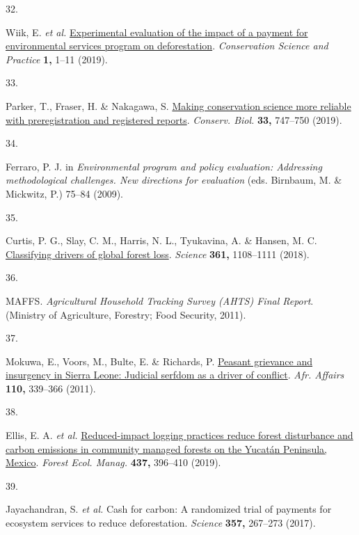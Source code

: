 \documentclass[
]{article}
\newlength{\cslhangindent}
\newlength{\csllabelwidth}
\newlength{\cslentryspacingunit} %
\newenvironment{CSLReferences}[2] %
 {%
  \setlength{\parindent}{0pt}
  \ifodd #1
  \let\oldpar\par
  \def\par{\hangindent=\cslhangindent\oldpar}
  \fi
  \setlength{\parskip}{#2\cslentryspacingunit}
 }%
 {}
\newcommand{\CSLLeftMargin}[1]{\parbox[t]{\csllabelwidth}{#1}}
\newcommand{\CSLRightInline}[1]{\parbox[t]{\linewidth - \csllabelwidth}{#1}\break}
\begin{document}
\begin{CSLReferences}{0}{0}
\leavevmode{}%
\CSLLeftMargin{32. }%
\CSLRightInline{Wiik, E. \emph{et al.}
\href{https://doi.org/10.1111/csp2.8}{{Experimental evaluation of the
impact of a payment for environmental services program on
deforestation}}. \emph{Conservation Science and Practice} \textbf{1,}
1--11 (2019).}

\leavevmode{}%
\CSLLeftMargin{33. }%
\CSLRightInline{Parker, T., Fraser, H. \& Nakagawa, S.
\href{https://doi.org/10.1111/cobi.13342}{{Making conservation science
more reliable with preregistration and registered reports}}.
\emph{Conserv. Biol.} \textbf{33,} 747--750 (2019).}

\leavevmode{}%
\CSLLeftMargin{34. }%
\CSLRightInline{Ferraro, P. J. in \emph{Environmental program and policy
evaluation: Addressing methodological challenges. New directions for
evaluation} (eds. Birnbaum, M. \& Mickwitz, P.) 75--84 (2009).}

\leavevmode{}%
\CSLLeftMargin{35. }%
\CSLRightInline{Curtis, P. G., Slay, C. M., Harris, N. L., Tyukavina, A.
\& Hansen, M. C.
\href{https://doi.org/10.1126/science.aau3445}{{Classifying drivers of
global forest loss}}. \emph{Science} \textbf{361,} 1108--1111 (2018).}

\leavevmode{}%
\CSLLeftMargin{36. }%
\CSLRightInline{MAFFS. \emph{{Agricultural Household Tracking Survey
(AHTS) Final Report}}. (Ministry of Agriculture, Forestry; Food
Security, 2011).}

\leavevmode{}%
\CSLLeftMargin{37. }%
\CSLRightInline{Mokuwa, E., Voors, M., Bulte, E. \& Richards, P.
\href{https://doi.org/10.1093/afraf/adr019}{{Peasant grievance and
insurgency in Sierra Leone: Judicial serfdom as a driver of conflict}}.
\emph{Afr. Affairs} \textbf{110,} 339--366 (2011).}

\leavevmode{}%
\CSLLeftMargin{38. }%
\CSLRightInline{Ellis, E. A. \emph{et al.}
\href{https://doi.org/10.1016/j.foreco.2019.01.040}{{Reduced-impact
logging practices reduce forest disturbance and carbon emissions in
community managed forests on the Yucat{á}n Peninsula, Mexico}}.
\emph{Forest Ecol. Manag.} \textbf{437,} 396--410 (2019).}

\leavevmode{}%
\CSLLeftMargin{39. }%
\CSLRightInline{Jayachandran, S. \emph{et al.} {Cash for carbon: A
randomized trial of payments for ecosystem services to reduce
deforestation}. \emph{Science} \textbf{357,} 267--273 (2017).}


\end{CSLReferences}
\end{document}
